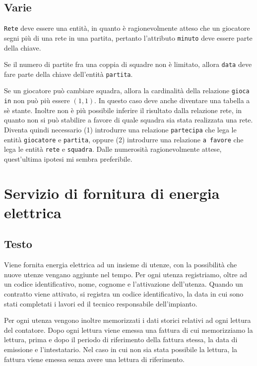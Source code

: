 \documentclass[11pt]{article}
\begin{document}
\subsection{Varie}
\texttt{Rete} deve essere una entit{\`a}, in quanto {\`e} ragionevolmente atteso che un
giocatore segni pi{\`u} di una rete in una partita, pertanto l'attributo \texttt{minuto}
deve essere parte della chiave.

Se il numero di partite fra una coppia di squadre non \`e limitato, allora
\texttt{data} deve fare parte della chiave dell'entit\`a \texttt{partita}.

Se un giocatore pu\`o cambiare squadra, allora la cardinalit\`a della relazione
\texttt{gioca in} non pu\`o pi\`u essere $(1,1)$. In questo caso deve anche
diventare una tabella a s\`e stante. Inoltre non {\`e} pi{\`u} possibile inferire il
risultato dalla relazione rete, in quanto non si pu{\`o} stabilire a favore di quale
squadra sia stata realizzata una rete. Diventa quindi necessario (1)
introdurre una relazione \texttt{partecipa} che lega le entit{\`a} \texttt{giocatore} e
\texttt{partita}, oppure (2) introdurre una relazione \texttt{a favore} che lega le entit{\`a} \texttt{rete} e
\texttt{squadra}. Dalle numerosit{\`a} ragionevolmente attese, quest'ultima
ipotesi mi sembra preferibile.

\newpage
\section{Servizio di fornitura di energia elettrica}

\subsection{Testo}

Viene fornita energia elettrica ad un insieme di utenze, con la possibilit\`a che nuove
utenze vengano aggiunte nel tempo. Per ogni utenza registriamo, oltre ad un codice
identificativo, nome, cognome e
l'attivazione dell'utenza. Quando un contratto viene attivato, si registra un codice
identificativo, la data in cui
sono stati completati i lavori ed il tecnico responsabile dell'impianto.

Per ogni utenza vengono inoltre memorizzati i dati storici relativi ad ogni lettura del
contatore. Dopo ogni lettura viene emessa una fattura di cui memorizziamo la lettura,
prima e dopo il periodo di riferimento della fattura stessa, la data di emissione e
l'intestatario. Nel caso in cui non sia stata possibile la lettura, la fattura viene
emessa senza avere una lettura di riferimento.
\end{document}
